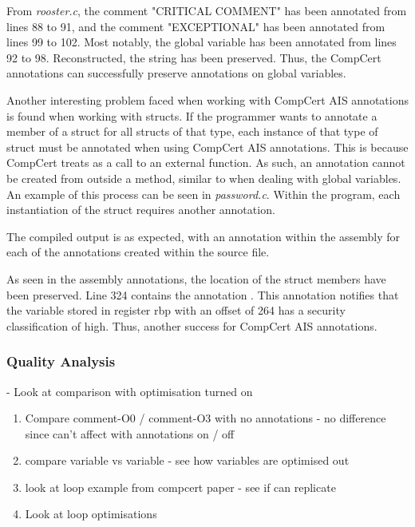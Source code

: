 

From \textit{rooster.c}, the comment "CRITICAL COMMENT" has been annotated from lines 88 to 91, and the comment "EXCEPTIONAL" has been annotated from lines 99 to 102. Most notably, the global variable  has been annotated from lines 92 to 98. Reconstructed, the string  has been preserved. Thus, the CompCert annotations can successfully preserve annotations on global variables.


Another interesting problem faced when working with CompCert AIS annotations is found when working with structs. If the programmer wants to annotate a member of a struct for all structs of that type, each instance of that type of struct must be annotated when using CompCert AIS annotations. This is because CompCert treats  as a call to an external function. As such, an annotation cannot be created from outside a method, similar to when dealing with global variables. An example of this process can be seen in \textit{password.c}. Within the program, each instantiation of the struct  requires another annotation. 



The compiled output is as expected, with an annotation within the assembly for each of the annotations created within the source file.



As seen in the assembly annotations, the location of the struct members have been preserved. Line 324 contains the annotation . This annotation notifies that the variable stored in register rbp with an offset of 264 has a security classification of high. Thus, another success for CompCert AIS annotations.

\subsubsection{Quality Analysis}
- Look at comparison with optimisation turned on

\begin{enumerate}
    \item Compare comment-O0 / comment-O3 with no annotations - no difference since can't affect with annotations on / off
    \item compare variable vs variable - see how variables are optimised out
    \item look at loop example from compcert paper - see if can replicate
    \item Look at loop optimisations
\end{enumerate}


